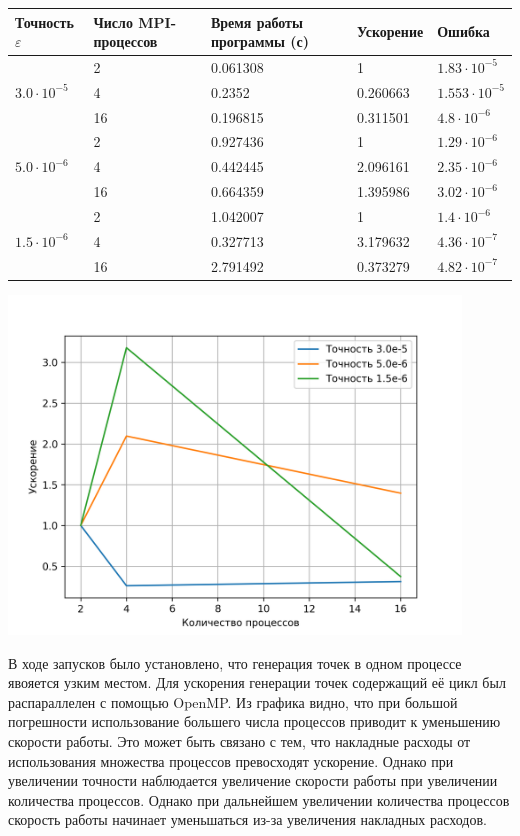 \documentclass[12pt]{article}
\begin{document}
\begin{center}
	\begin{tabular}{|l|l|l|l|l|}
		\hline
		Точность $\varepsilon$ &
		Число MPI-процессов &
		Время работы программы (с) &
		Ускорение &
		Ошибка \\
		\hline
		& 2 & 0.061308 & 1 & $1.83 \cdot 10^{-5}$ \\
		\cline{2-5}
		$3.0 \cdot 10^{-5}$
		& 4 & 0.2352 & 0.260663 & $1.553 \cdot 10^{-5}$ \\
		\cline{2-5}
		& 16 & 0.196815 & 0.311501 & $4.8 \cdot 10^{-6}$ \\

		\hline
		& 2 & 0.927436 & 1 & $1.29 \cdot 10^{-6}$ \\
		\cline{2-5}
		$5.0 \cdot 10^{-6}$
		& 4 & 0.442445 & 2.096161 & $2.35 \cdot 10^{-6}$ \\
		\cline{2-5}
		& 16 & 0.664359 & 1.395986 & $3.02 \cdot 10^{-6}$ \\

		\hline
		& 2 & 1.042007 & 1 & $1.4 \cdot 10^{-6}$ \\
		\cline{2-5}
		$1.5 \cdot 10^{-6}$
		& 4 & 0.327713 & 3.179632 & $4.36 \cdot 10^{-7}$ \\
		\cline{2-5}
		& 16 & 2.791492 & 0.373279 & $4.82 \cdot 10^{-7}$ \\
		\hline
	\end{tabular}

	\medskip

	\includegraphics[width=0.9\textwidth]{plot.png}
\end{center}

В ходе запусков было установлено, что генерация точек в одном процессе
явояется узким местом. Для ускорения генерации точек содержащий
её цикл был распараллелен с помощью OpenMP. Из графика видно, что при
большой погрешности использование большего числа процессов приводит к
уменьшению скорости работы. Это может быть связано с тем, что накладные
расходы от использования множества процессов превосходят ускорение.
Однако при увеличении точности наблюдается увеличение скорости работы
при увеличении количества процессов. Однако при дальнейшем увеличении
количества процессов скорость работы начинает уменьшаться из-за увеличения
накладных расходов.
\end{document}
